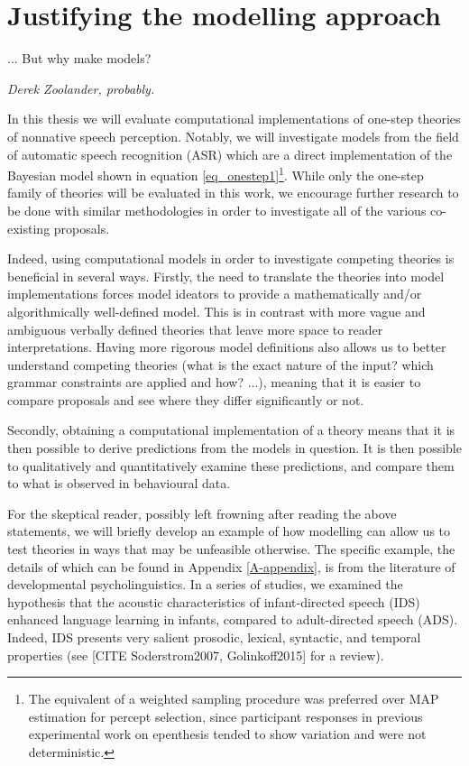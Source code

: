 \section{Justifying the modelling approach}
\setlength{\epigraphwidth}{0.4\textwidth}
\epigraph{... But why make models?}{\textit{Derek Zoolander, probably.}}


In this thesis we will evaluate computational implementations of one-step theories of nonnative speech perception. Notably, we will investigate models from the field of automatic speech recognition (ASR) which are a direct implementation of the Bayesian model shown in equation \ref{eq_onestep1}\footnote{The equivalent of a weighted sampling procedure was preferred over MAP estimation for percept selection, since participant responses in previous experimental work on epenthesis tended to show variation and were not deterministic.}. 
While only the one-step family of theories will be evaluated in this work, we encourage further research to be done with similar methodologies in order to investigate all of the various co-existing proposals.

Indeed, using computational models in order to investigate competing theories is beneficial in several ways. Firstly, the need to translate the theories into model implementations forces model ideators to provide a mathematically and/or algorithmically well-defined model. This is in contrast with more vague and ambiguous verbally defined theories that leave more space to reader interpretations. Having more rigorous model definitions also allows us to better understand competing theories (what is the exact nature of the input? which grammar constraints are applied and how? ...), meaning that it is easier to compare proposals and see where they differ significantly or not. 

Secondly, obtaining a computational implementation of a theory means that it is then possible to derive predictions from the models in question. It is then possible to qualitatively and quantitatively examine these predictions, and compare them to what is observed in behavioural data.

For the skeptical reader, possibly left frowning after reading the above statements, we will briefly develop an example of how modelling can allow us to test theories in ways that may be unfeasible otherwise. The specific example, the details of which can be found in Appendix \ref{A-appendix}, is from the literature of developmental psycholinguistics. In a series of studies, we examined the hypothesis that the acoustic characteristics of infant-directed speech (IDS) enhanced language learning in infants, compared to adult-directed speech (ADS). Indeed, IDS presents very salient prosodic, lexical, syntactic, and temporal properties (see [CITE Soderstrom2007, Golinkoff2015] for a review).


